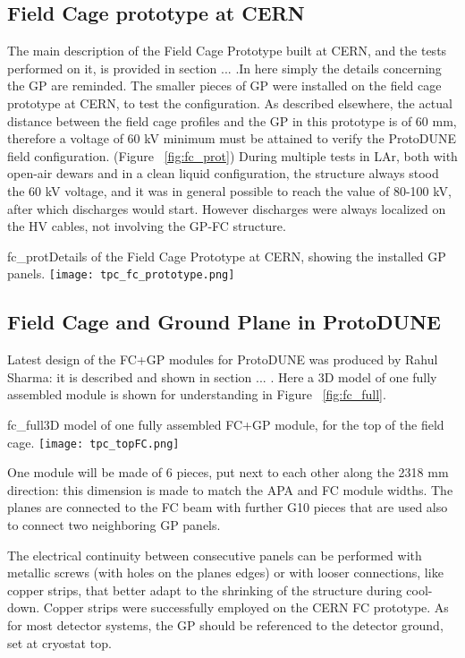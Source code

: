 \subsection{Field Cage prototype at CERN}
The main description of the Field Cage Prototype built at CERN, and the tests performed on it, is provided in section ... .In here simply the details concerning the GP are reminded. The smaller pieces of GP were installed on the field cage prototype at CERN, to test the configuration. As described elsewhere, the actual distance between the field cage profiles and the GP in this prototype is of 60 mm, therefore a voltage of 60 kV minimum must be attained to verify the ProtoDUNE field configuration. (Figure ~\ref{fig:fc_prot}) During multiple tests in LAr, both with open-air dewars and in a clean liquid configuration, the structure always stood the 60 kV voltage, and it was in general possible to reach the value of 80-100 kV, after which discharges would start. However discharges were always localized on the HV cables, not involving the GP-FC structure.

\begin{cdrfigure}{fc_prot}{Details of the Field Cage Prototype at CERN, showing the installed GP panels.}
\texttt{[image: tpc\_fc\_prototype.png]}
\end{cdrfigure}

\subsection{Field Cage and Ground Plane in ProtoDUNE}

Latest design of the FC+GP modules for ProtoDUNE was produced by Rahul Sharma: it is described and shown in section ... . Here a 3D model of one fully assembled module is shown for understanding in Figure ~\ref{fig:fc_full}.

\begin{cdrfigure}{fc_full}{3D model of one fully assembled FC+GP module, for the top of the field cage. }
\texttt{[image: tpc\_topFC.png]}
\end{cdrfigure}

One module will be made of 6 pieces, put next to each other along the 2318 mm direction: this dimension is made to match the APA and FC module widths. The planes are connected to the FC beam with further G10 pieces that are used also to connect two neighboring GP panels.

The electrical continuity between consecutive panels can be performed with metallic screws (with holes on the planes edges) or with looser connections, like copper strips, that better adapt to the shrinking of the structure during cool-down. Copper strips were successfully employed on the CERN FC prototype.
As for most detector systems, the GP should be referenced to the detector ground, set at cryostat top.

